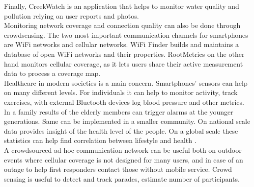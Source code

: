 \documentclass[conference,letterpaper]{IEEEtran}
\begin{document}
\indent Finally, CreekWatch \cite{CreekWatch} is an application that helps to monitor water quality and pollution relying on user reports and photos.\\\indent 
Monitoring network coverage and connection quality can also be done through crowdsensing. The two most important communication channels for smartphones are WiFi networks and cellular networks. WiFi Finder \cite{WiFiFinder} builds and maintains a database of open WiFi networks and their properties. RootMetrics \cite{RootMetrics} on the other hand monitors cellular coverage, as it lets users share their active measurement data to process a coverage map.\\
\indent Healthcare in modern societies is a main concern. Smartphones' sensors can help on many different levels. For individuals it can help to monitor activity, track exercises, with external Bluetooth devices log blood pressure and other metrics. In a family results of the elderly members can trigger alarms at the younger generations. Same can be implemented in a smaller community. On national scale data provides insight of the health level of the people. On a global scale these statistics can help find correlation between lifestyle and health \cite{Jeffrey2006}.\\
\indent A crowdsourced ad-hoc communication network can be useful both on outdoor events where cellular coverage is not designed for many users, and in case of an outage to help first responders contact those without mobile service. Crowd sensing is useful to detect and track parades, estimate number of participants.
\end{document}
